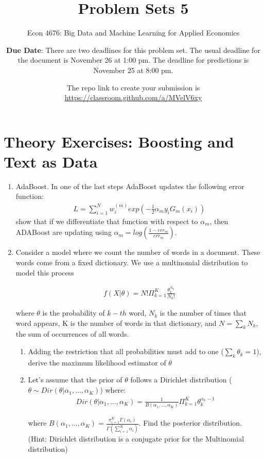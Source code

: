 \documentclass[12pt,onecolumn]{article}
\title{Problem Sets 5}
\subtitle{Econ 4676: Big Data and Machine Learning for Applied Economics}
\author{{\bf Due Date}: There are two deadlines for this problem set. The usual deadline for the document is November 26 at 1:00 pm. The deadline for predictions is November 25 at 8:00 pm. }
\date{}
\date{The repo link to create your submission is \url{https://classroom.github.com/a/MVelV6xy}}
\begin{document}
\maketitle

\section{Theory Exercises: Boosting and Text as Data}

\begin{enumerate}
  \item AdaBoost. In one of the last steps AdaBoost updates the following error function:
   \begin{align}
   L=\sum_{i=1}^N w^{(m)}_i exp\left(-\frac{1}{2}\alpha_m y_i G_m(x_i)\right)
   \end{align}
 show that if we differentiate that function with respect to $\alpha_m$, then ADABoost are updating using $\alpha_m=log(\frac{1-err_m}{err_m})$. 

\item Consider a model where we count the number of words in a document. These words come from a fixed dictionary. We use a multinomial distribution to model this process

\begin{align}
f(X|\theta) = N! \Pi_{k=1}^K \frac{\theta_k^{N_k}}{N_k!}
\end{align}

where $\theta$ is the probability of $k-th$ word, $N_k$ is the number of times that word appears, K is the number of words in that dictionary, and $N=\sum_k N_k$, the sum of occurrences of all words.

\begin{enumerate}
  \item Adding the restriction that all probabilities must add to one ($\sum_k\theta_k=1$), derive the maximum likelihood estimator of $\theta$
  \item Let's assume that the prior of $\theta$ follows a Dirichlet distribution ($\theta\sim Dir(\theta|\alpha _{1},\ldots ,\alpha _{K})$) where:
  \begin{align}
    Dir(\theta|\alpha _{1},\ldots ,\alpha _{K}) =\frac{1}{B(\alpha _{1},\ldots ,\alpha _{K})} \Pi_{k=1}^K \theta_k^{\alpha_k-1}
  \end{align}

 where $ B(\alpha _{1},\ldots ,\alpha _{K})=\frac{\pi _{i=1}^{K} \Gamma(\alpha _{i})}{\Gamma \left(\sum _{i=1}^{K}\alpha _{i}\right)}$. Find the posterior distribution. (Hint: Dirichlet distribution is a conjugate prior for the Multinomial distribution)


\end{enumerate}
\end{enumerate}
\end{document}
